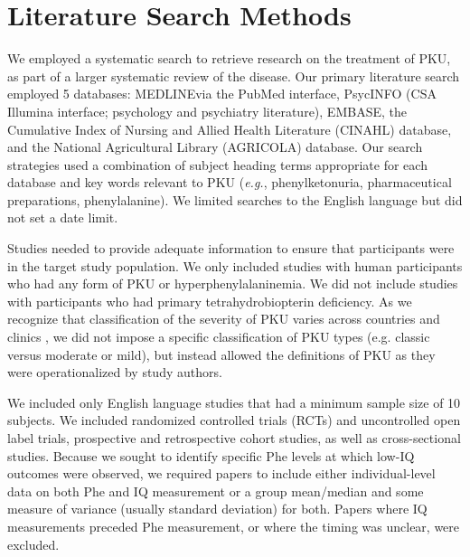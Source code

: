 \documentclass{svjour3}                     %
\begin{document}
\section{Literature Search Methods} %
\label{sec:Literature Search Methods}

We employed a systematic search to retrieve research on the treatment of PKU, as part of a larger systematic review of the disease. Our primary literature search employed 5 databases: MEDLINE\textregistered via the PubMed interface, PsycINFO (CSA Illumina interface; psychology and psychiatry literature), EMBASE, the Cumulative Index of Nursing and Allied Health Literature (CINAHL) database, and the National Agricultural Library (AGRICOLA) database. Our search strategies used a combination of subject heading terms appropriate for each database and key words relevant to PKU (\emph{e.g.}, phenylketonuria, pharmaceutical preparations, phenylalanine). We limited searches to the English language but did not set a date limit.

Studies needed to provide adequate information to ensure that participants were in the target study population. We only included studies with human participants who had any form of PKU or hyperphenylalaninemia. We did not include studies with participants who had primary tetrahydrobiopterin deficiency. As we recognize that classification of the severity of PKU varies across countries and clinics \citep{NationalInstitutesofHealthConsensusDevelopmentPanel:2001ti}, we did not impose a specific classification of PKU types (e.g. classic versus moderate or mild), but instead allowed the definitions of PKU as they were operationalized by study authors.

We included only English language studies that had a minimum sample size of 10 subjects. We included randomized controlled trials (RCTs) and uncontrolled open label trials, prospective and retrospective cohort studies, as well as cross-sectional studies. Because we sought to identify specific Phe levels at which low-IQ outcomes were observed, we required papers to include either individual-level data on both Phe and IQ measurement or a group mean/median and some measure of variance (usually standard deviation) for both. Papers where IQ measurements preceded Phe measurement, or where the timing was unclear, were excluded.
\end{document}
